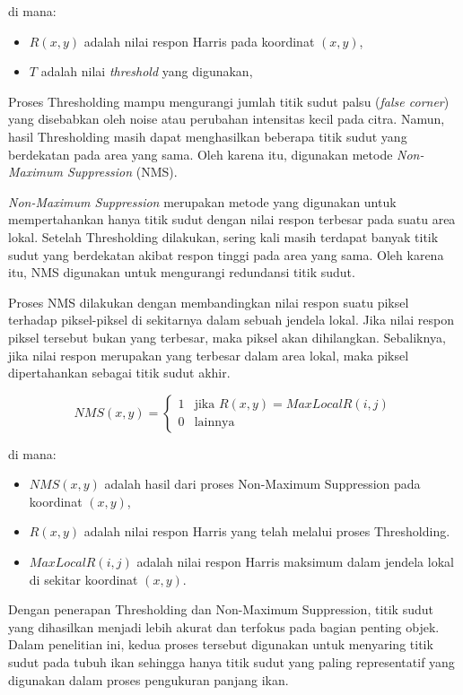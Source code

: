 di mana:
\begin{itemize}
    \item $R(x,y)$ adalah nilai respon Harris pada koordinat $(x,y)$,
    \item $T$ adalah nilai \textit{threshold} yang digunakan,
\end{itemize}

Proses Thresholding mampu mengurangi jumlah titik sudut palsu (\textit{false corner}) yang disebabkan oleh noise atau perubahan intensitas kecil pada citra. Namun, hasil Thresholding masih dapat menghasilkan beberapa titik sudut yang berdekatan pada area yang sama. Oleh karena itu, digunakan metode \textit{Non-Maximum Suppression} (NMS).

\textit{Non-Maximum Suppression} merupakan metode yang digunakan untuk mempertahankan hanya titik sudut dengan nilai respon terbesar pada suatu area lokal. Setelah Thresholding dilakukan, sering kali masih terdapat banyak titik sudut yang berdekatan akibat respon tinggi pada area yang sama. Oleh karena itu, NMS digunakan untuk mengurangi redundansi titik sudut.

Proses NMS dilakukan dengan membandingkan nilai respon suatu piksel terhadap piksel-piksel di sekitarnya dalam sebuah jendela lokal. Jika nilai respon piksel tersebut bukan yang terbesar, maka piksel akan dihilangkan. Sebaliknya, jika nilai respon merupakan yang terbesar dalam area lokal, maka piksel dipertahankan sebagai titik sudut akhir.

\[
    NMS(x,y) =
    \begin{cases}
        1 & \text{jika } R(x,y) = MaxLocal R(i,j) \\
        0 & \text{lainnya }
    \end{cases}
\]

di mana:
\begin{itemize}
    \item $NMS(x,y)$ adalah hasil dari proses Non-Maximum Suppression pada koordinat $(x,y)$,
    \item $R(x,y)$ adalah nilai respon Harris yang telah melalui proses Thresholding.
    \item $MaxLocal R(i,j)$ adalah nilai respon Harris maksimum dalam jendela lokal di sekitar koordinat $(x,y)$.
\end{itemize}

Dengan penerapan Thresholding dan Non-Maximum Suppression, titik sudut yang dihasilkan menjadi lebih akurat dan terfokus pada bagian penting objek. Dalam penelitian ini, kedua proses tersebut digunakan untuk menyaring titik sudut pada tubuh ikan sehingga hanya titik sudut yang paling representatif yang digunakan dalam proses pengukuran panjang ikan.

